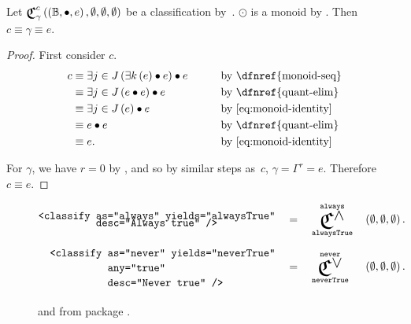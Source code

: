 \begin{lemma}
  Let $\Classify^c_\gamma\left(\Monoid\Bool\monoidop e,\emptyset,\emptyset,\emptyset\right)$
    be a classification by~.
  $\odot$ is a monoid by .
  Then $c \equiv \gamma \equiv e$.
\end{lemma}
\begin{proof}
  First consider $c$.
  \begin{alignat*}{3}
    c &\equiv \Exists{j\in J}{\Exists{k}{e}\monoidop e} \monoidop e
        \qquad&&\text{by \dfnref{monoid-seq}} \label{p:cri-c} \\
      &\equiv \Exists{j\in J}{e \monoidop e} \monoidop e
        &&\text{by \dfnref{quant-elim}} \\
      &\equiv \Exists{j\in J}{e} \monoidop e
        &&\text{by \ref{eq:monoid-identity}} \\
      &\equiv e \monoidop e
        &&\text{by \dfnref{quant-elim}} \\
      &\equiv e.
        &&\text{by \ref{eq:monoid-identity}}
  \end{alignat*}

  For $\gamma$,
    we have $r=0$ by ,
    and so by similar steps as~$c$,
      $\gamma=\Gamma^r=e$.
  Therefore $c\equiv e$.
\end{proof}


\begin{figure}[ht]
  \begin{alignat*}{3}
    \begin{aligned}
      \xml{<classify }&\xml{as="always" yields="alwaysTrue"} \xmlnl
                      &\xml{desc="Always true" />}
    \end{aligned}
      \quad&=\quad
      \Classifyland^\texttt{always}_\texttt{alwaysTrue}
        &&\left(\emptyset,\emptyset,\emptyset\right). \\
    \begin{aligned}
      \xml{<classify }&\xml{as="never" yields="neverTrue"} \xmlnl
                      &\xml{any="true"} \xmlnl
                      &\xml{desc="Never true" />}
    \end{aligned}
      \quad&=\quad
      \Classifylor^\texttt{never}_\texttt{neverTrue}
        &&\left(\emptyset,\emptyset,\emptyset\right).
  \end{alignat*}
  \caption{ and  from package
             .}
  \label{fig:always-never}
\end{figure}

